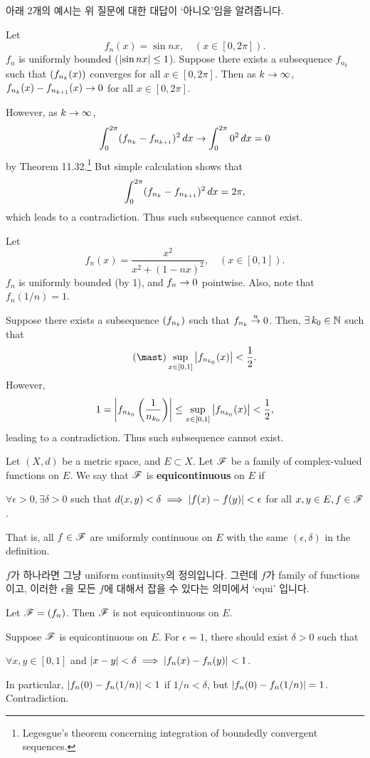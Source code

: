 아래 2개의 예시는 위 질문에 대한 대답이 `아니오'임을 알려줍니다.

 Let
\[
    f_n(x) = \sin nx, \quad (x \in [0, 2\pi]).
\]
\(f_n\) is uniformly bounded (\(\left| \sin nx \right| \leq 1\)). Suppose there exists a subsequence \(f_{n_k}\) such that \(\left( f_{n_k}(x) \right)\) converges for all \(x \in [0, 2\pi]\). Then as \(k\rightarrow\infty\), \(f_{n_k}(x) - f_{n_{k+1}}(x) \rightarrow 0\) for all \(x \in [0, 2\pi]\).

However, as \(k \rightarrow \infty\),
\[
    \int_0^{2\pi} (f_{n_k} - f_{n_{k+1}})^2 \,d{x} \rightarrow \int_0^{2\pi} 0^2 \,d{x} = 0
\]
by Theorem 11.32.\footnote{Legesgue's theorem concerning integration of boundedly convergent sequences.} But simple calculation shows that
\[
    \int_0^{2\pi} (f_{n_k} - f_{n_{k+1}})^2 \,d{x} = 2\pi,
\]
which leads to a contradiction. Thus such subsequence cannot exist.

 Let
\[
    f_n(x) = \frac{x^2}{x^2 + (1-nx)^2}, \quad (x\in [0, 1]).
\]
\(f_n\) is uniformly bounded (by 1), and \(f_n \rightarrow 0\) pointwise. Also, note that \(f_n(1/n) = 1\).

Suppose there exists a subsequence \(\left( f_{n_k} \right)\) such that \(f_{n_k} \overset{u}{\rightarrow} 0\). Then, \(\exists k_0 \in \N\) such that
\[ \tag{\mast}
    \sup_{x \in [0, 1]} \abs{f_{n_{k_0}}(x)} < \frac{1}{2}.
\]
However,
\[
    1 = \left| f_{n_{k_0}}\left(\frac{1}{n_{k_0}}\right) \right| \leq \sup_{x \in [0, 1]} \left| f_{n_{k_0}}(x) \right| < \frac{1}{2},
\]
leading to a contradiction. Thus such subsequence cannot exist.

 Let \((X, d)\) be a metric space, and \(E \subset X\). Let \(\mathscr{F}\) be a family of complex-valued functions on \(E\). We say that \(\mathscr{F}\) is \textbf{equicontinuous} on \(E\) if
\begin{center}
    \(\forall \epsilon > 0, \exists \delta > 0\) such that \(d(x, y) < \delta \implies \left| f(x) - f(y) \right| < \epsilon\) for all \(x, y \in E, f\in \mathscr{F}\).
\end{center}
That is, all \(f \in \mathscr{F}\) are uniformly continuous on \(E\) with the same \((\epsilon, \delta)\) in the definition.

\(f\)가 하나라면 그냥 uniform continuity의 정의입니다. 그런데 \(f\)가 family of functions이고, 이러한 \(\epsilon\)을 모든 \(f\)에 대해서 잡을 수 있다는 의미에서 `equi' 입니다.

\rmk {} Let \(\mathscr{F} = \left( f_n \right)\). Then \(\mathscr{F}\) is not equicontinuous on \(E\).

\pf Suppose \(\mathscr{F}\) is equicontinuous on \(E\). For \(\epsilon = 1\), there should exist \(\delta > 0\) such that
\begin{center}
    \(\forall x, y \in [0, 1]\) and \(\left| x - y \right| < \delta \implies \left| f_n(x) - f_n(y) \right| < 1\).
\end{center}
In particular, \(\left| f_n(0) - f_n(1/n) \right| < 1\) if \(1 / n < \delta\), but \(\left| f_n(0) - f_n(1/n) \right| = 1\). Contradiction.

